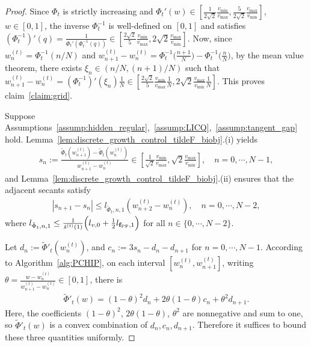 \documentclass{article}
\newcommand{\fPF}{{\mathbf{f}_{\rm PF}}}
\newcommand{\Farc}{\Phi}
\begin{document}
\begin{proof}
Since $\Farc_t$ is strictly increasing and $\Farc_t'(w)\in \left[\frac{1}{2\sqrt2}\frac{v_{\min}}{v_{\max}}, 
\frac{5}{2\sqrt2}\frac{v_{\max}}{v_{\min}}\right]$, $w\in[0,1]$,
the inverse $\Farc_t^{-1}$ is well-defined on $[0,1]$ and satisfies
$
(\Farc_t^{-1})'(q)=\frac{1}{\Farc_t'(\Farc_t^{-1}(q))}
\in
\left[
\frac{2\sqrt2}{5}\frac{v_{\min}}{v_{\max}},
2\sqrt2\frac{v_{\max}}{v_{\min}}
\right].
$
Now, since $w_n^{(t)}=\Farc_t^{-1}(n/N)$ and $w_{n+1}^{(t)}-w_n^{(t)} = \Farc_t^{-1}\Big(\frac{n+1}{N}\Big)-\Farc_t^{-1}\Big(\frac{n}{N}\Big)$,
by the mean value theorem, there exists $\xi_n\in(n/N,(n+1)/N)$ such that
$w_{n+1}^{(t)}-w_n^{(t)}= (\Farc_t^{-1})'(\xi_n)\frac{1}{N}\in \left[ \frac{2\sqrt2}{5}\frac{v_{\min}}{v_{\max}}\frac{1}{N}, 2\sqrt2\frac{v_{\max}}{v_{\min}}\frac{1}{N} \right]$. This proves claim~\ref{claim:grid}.

Suppose Assumptions~\ref{assump:hidden_regular},~\ref{assump:LICQ},~\ref{assump:tangent_gap} hold. Lemma~\ref{lem:discrete_growth_control_tildeF_biobj}.(i) yields 
\begin{align}
s_n:=\frac{\tilde \Farc_t(w_{n+1}^{(t)})-\tilde \Farc_t(w_n^{(t)})}{w_{n+1}^{(t)}-w_n^{(t)}}\in\left[\frac{1}{\sqrt2}\frac{v_{\min}}{v_{\max}},\sqrt2\frac{v_{\max}}{v_{\min}}\right],\quad n=0,\cdots,N-1,
\end{align}
and Lemma~\ref{lem:discrete_growth_control_tildeF_biobj}.(ii) ensures that the adjacent secants satisfy
\begin{align}
|s_{n+1}-s_n|\le l_{\tilde \Farc_t,n,1}(w_{n+2}^{(t)}-w_n^{(t)}), \label{eq: secant Lipschitz-smooth}
\quad n=0,\cdots,N-2,
\end{align}
where $l_{\tilde \Farc_t,n,1}\leq \frac{1}{\tilde s^{(t)}(1)}\Bigl(l_{v,0}+\frac12 l_{\fPF,1}\Bigr)$ for all $n \in\{0,\cdots,N-2\}$.

Let $d_n:=\tilde \Farc'_t(w_n^{(t)})$, and $c_n:=3s_n-d_n-d_{n+1}$ for $n=0,\cdots,N-1$.
According to Algorithm~\ref{alg:PCHIP}, on each interval $[w_n^{(t)},w_{n+1}^{(t)}]$, writing $\theta=\frac{w-w_n^{(t)}}{w_{n+1}^{(t)}-w_n^{(t)}}\in[0,1]$, there is
\begin{align}
\tilde \Farc'_t(w)
=
(1-\theta)^2 d_n
+
2\theta(1-\theta)c_n
+
\theta^2 d_{n+1}.
\end{align}
Here, the coefficients $(1-\theta)^2$, $2\theta(1-\theta)$, $\theta^2$ are nonnegative and sum to one, so $\tilde \Farc'_t(w)$ is a convex combination of $d_n,c_n,d_{n+1}$. Therefore it suffices to bound these three quantities uniformly.


\end{proof}
\end{document}
